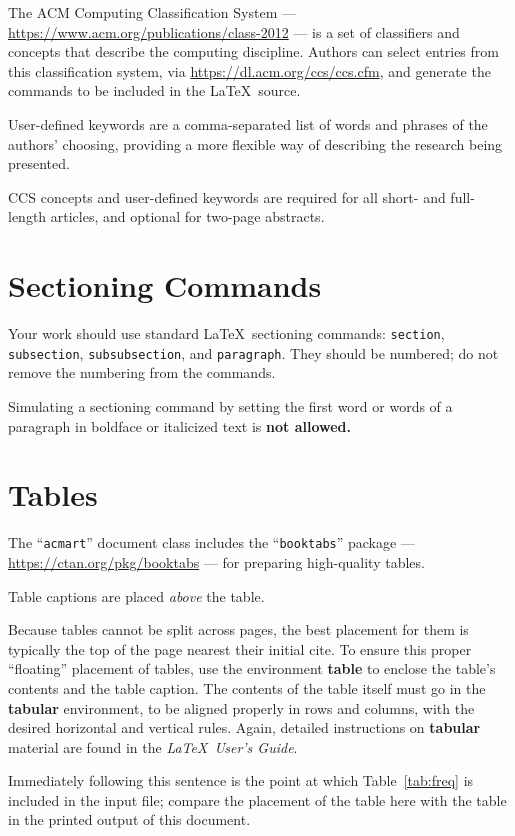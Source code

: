 \documentclass[sigconf]{acmart}
\begin{document}
The ACM Computing Classification System --- \url{https://www.acm.org/publications/class-2012} --- is a set of classifiers and concepts that describe the computing discipline. Authors can select entries from this classification system, via \url{https://dl.acm.org/ccs/ccs.cfm}, and generate the commands to be included in the \LaTeX\ source. 

User-defined keywords are a comma-separated list of words and phrases of the authors' choosing, providing a more flexible way of describing the research being presented.

CCS concepts and user-defined keywords are required for all short- and full-length articles, and optional for two-page abstracts. 

\section{Sectioning Commands}

Your work should use standard \LaTeX\ sectioning commands: \verb|section|, \verb|subsection|, \verb|subsubsection|, and \verb|paragraph|. They should be numbered; do not remove the numbering from the commands. 

Simulating a sectioning command by setting the first word or words of a paragraph in boldface or italicized text is {\bf not allowed.}

\section{Tables}

The ``\verb|acmart|'' document class includes the ``\verb|booktabs|'' package --- \url{https://ctan.org/pkg/booktabs} --- for preparing high-quality tables. 

Table captions are placed {\it above} the table.

Because tables cannot be split across pages, the best placement for them is typically the top of the page nearest their initial cite.  To ensure this proper ``floating'' placement of tables, use the environment \textbf{table} to enclose the table's contents and the table caption.  The contents of the table itself must go in the \textbf{tabular} environment, to be aligned properly in rows and columns, with the desired horizontal and vertical rules.  Again, detailed instructions on \textbf{tabular} material are found in the \textit{\LaTeX\ User's Guide}.

Immediately following this sentence is the point at which Table~\ref{tab:freq} is included in the input file; compare the placement of the table here with the table in the printed output of this document.
\end{document}
